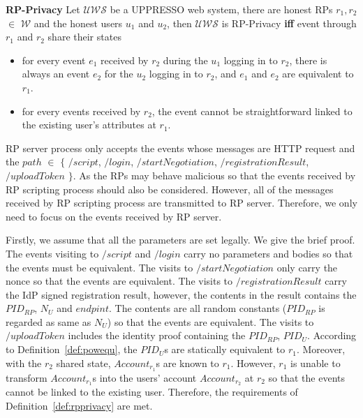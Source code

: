 {\begin{definition}
\vspace{1mm}\noindent\textbf{RP-Privacy} Let  $\mathcal{UWS}$ be a UPPRESSO web system, there are honest RPs $r_1, r_2$ $\in$ $\mathcal{W}$ and the honest users $u_1$ and $u_2$, then $\mathcal{UWS}$ is RP-Privacy \textbf{iff} event through $r_1$ and $r_2$ share their states
\begin{itemize}
\item for every event $e_1$ received by $r_2$ during the $u_1$ logging in to $r_2$, there is always an event $e_2$ for the $u_2$ logging in to $r_2$, and $e_1$ and $e_2$ are equivalent to $r_1$.
\item for every events received by $r_2$, the event cannot be straightforward linked to the existing user's attributes at $r_1$.
\end{itemize}
\label{def:rpprivacy}
\end{definition}
RP server process only accepts the events whose messages are HTTP request and the $path$ $\in$ $\{$ $/script$, $/login$, $/startNegotiation$,  $/registrationResult$, $/uploadToken$ $\}$.
As the RPs may behave malicious so that the events received by RP scripting process should also be considered. However, all of the messages received by RP scripting process are transmitted to RP server. Therefore, we only need to focus on the events received by RP server. 

Firstly, we assume that all the parameters are set legally. We give the brief proof. The events visiting to $/script$ and $/login$ carry no parameters and bodies so that the events must be equivalent. The visits to  $/startNegotiation$ only carry the nonce so that the events are equivalent. The visits to  $/registrationResult$ carry the IdP signed registration result, however, the contents in the result  contains the $PID_{RP}$, $N_U$ and $endpint$. The contents are all random constants ($PID_{RP}$ is regarded as same as $N_U$) so that the events are equivalent. The visits to  $/uploadToken$ includes the identity proof containing the $PID_{RP}$, $PID_U$. According to Definition~\ref{def:powequ}, the $PID_U$s are statically equivalent to $r_1$.  Moreover, with the $r_2$ shared state, $Account_{r_1}$s are known to $r_1$. However, $r_1$ is unable to transform $Account_{r_1}$s into the users' account $Account_{r_2}$ at $r_2$  so that the events cannot be linked to the existing user. Therefore, the requirements of  Definition~\ref{def:rpprivacy}  are met.

}
